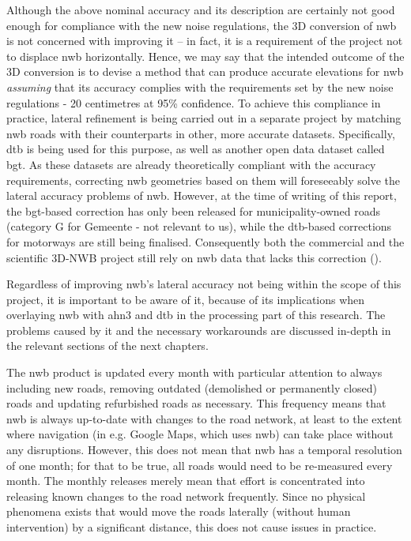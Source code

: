 Although the above nominal accuracy and its description are certainly not good enough for compliance with the new noise regulations, the 3D conversion of \ac{nwb} is not concerned with improving it – in fact, it is a requirement of the project not to displace \ac{nwb} horizontally. Hence, we may say that the intended outcome of the 3D conversion is to devise a method that can produce accurate elevations for \ac{nwb} \textit{assuming} that its accuracy complies with the requirements set by the new noise regulations - 20 centimetres at 95\% confidence. To achieve this compliance in practice, lateral refinement is being carried out in a separate project by matching \ac{nwb} roads with their counterparts in other, more accurate datasets. Specifically, \ac{dtb} is being used for this purpose, as well as another open data dataset called \ac{bgt}. As these datasets are already theoretically compliant with the accuracy requirements, correcting \ac{nwb} geometries based on them will foreseeably solve the lateral accuracy problems of \ac{nwb}. However, at the time of writing of this report, the \ac{bgt}-based correction has only been released for municipality-owned roads (category G for Gemeente - not relevant to us), while the \ac{dtb}-based corrections for motorways are still being finalised. Consequently both the commercial and the scientific 3D-NWB project still rely on \ac{nwb} data that lacks this correction (\cite{nwb_gecorrigeerd}).

Regardless of improving \ac{nwb}’s lateral accuracy not being within the scope of this project, it is important to be aware of it, because of its implications when overlaying \ac{nwb} with \ac{ahn3} and \ac{dtb} in the processing part of this research. The problems caused by it and the necessary workarounds are discussed in-depth in the relevant sections of the next chapters.

The \ac{nwb} product is updated every month with particular attention to always including new roads, removing outdated (demolished or permanently closed) roads and updating refurbished roads as necessary. This frequency means that \ac{nwb} is always up-to-date with changes to the road network, at least to the extent where navigation (in e.g. Google Maps, which uses \ac{nwb}) can take place without any disruptions. However, this does not mean that \ac{nwb} has a temporal resolution of one month; for that to be true, all roads would need to be re-measured every month. The monthly releases merely mean that effort is concentrated into releasing known changes to the road network frequently. Since no physical phenomena exists that would move the roads laterally (without human intervention) by a significant distance, this does not cause issues in practice.

